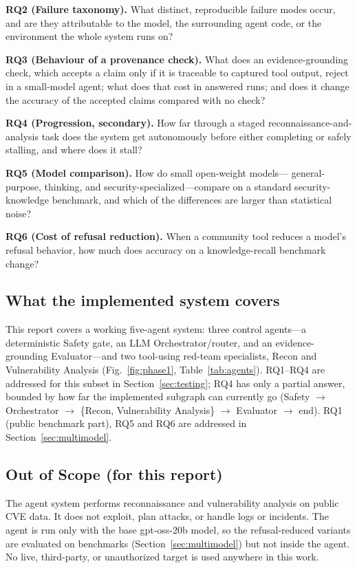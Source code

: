 \documentclass[conference]{IEEEtran}
\begin{document}
\textbf{RQ2 (Failure taxonomy).} What distinct, reproducible failure modes
occur, and are they attributable to the model, the surrounding agent code,
or the environment the whole system runs on?

\textbf{RQ3 (Behaviour of a provenance check).} What does an
evidence-grounding check, which accepts a claim only if it is traceable to
captured tool output, reject in a small-model agent; what does that cost in
answered runs; and does it change the accuracy of the accepted claims compared
with no check?

\textbf{RQ4 (Progression, secondary).} How far through a staged
reconnaissance-and-analysis task does the system get autonomously before
either completing or safely stalling, and where does it stall?

\textbf{RQ5 (Model comparison).} How do small open-weight models---%
general-purpose, thinking, and security-specialized---compare on a
standard security-knowledge benchmark, and which of the differences are
larger than statistical noise?

\textbf{RQ6 (Cost of refusal reduction).} When a community tool reduces a
model's refusal behavior, how much does accuracy on a knowledge-recall
benchmark change?

\subsection{What the implemented system covers}

This report covers a working five-agent system: three control
agents---a deterministic Safety gate, an LLM Orchestrator/router, and an
evidence-grounding Evaluator---and two tool-using red-team specialists,
Recon and Vulnerability Analysis (Fig.~\ref{fig:phase1},
Table~\ref{tab:agents}). RQ1--RQ4 are addressed for this
subset in Section~\ref{sec:testing}; RQ4 has only a partial answer, bounded
by how far the implemented subgraph can currently go (Safety
$\rightarrow$ Orchestrator $\rightarrow$ \{Recon, Vulnerability Analysis\}
$\rightarrow$ Evaluator $\rightarrow$ end). RQ1 (public benchmark part),
RQ5 and RQ6 are addressed in Section~\ref{sec:multimodel}.

\subsection{Out of Scope (for this report)}

The agent system performs reconnaissance and vulnerability analysis on
public CVE data. It does not exploit, plan attacks, or handle logs or
incidents. The
agent is run only with the base gpt-oss-20b model, so the refusal-reduced
variants are evaluated on benchmarks (Section~\ref{sec:multimodel}) but not
inside the agent. No live, third-party, or unauthorized target is used
anywhere in this work.
\end{document}
